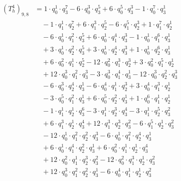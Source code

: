 \begin{align*}(T_{h}^4)_{9,8}&=1\cdot q_0^{1}\cdot q_3^{7}-6\cdot q_0^{3}\cdot q_3^{5}+6\cdot q_0^{5}\cdot q_3^{3}-1\cdot q_0^{7}\cdot q_3^{1}\\
&\quad -1\cdot q_1^{1}\cdot q_2^{7}+6\cdot q_1^{3}\cdot q_2^{5}-6\cdot q_1^{5}\cdot q_2^{3}+1\cdot q_1^{7}\cdot q_2^{1}\\
&\quad -6\cdot q_0^{1}\cdot q_1^{2}\cdot q_3^{5}+6\cdot q_0^{1}\cdot q_1^{4}\cdot q_3^{3}-1\cdot q_0^{1}\cdot q_1^{6}\cdot q_3^{1}\\
&\quad +3\cdot q_0^{1}\cdot q_2^{2}\cdot q_3^{5}+3\cdot q_0^{1}\cdot q_2^{4}\cdot q_3^{3}+1\cdot q_0^{1}\cdot q_2^{6}\cdot q_3^{1}\\
&\quad +6\cdot q_0^{2}\cdot q_1^{1}\cdot q_2^{5}-12\cdot q_0^{2}\cdot q_1^{3}\cdot q_2^{3}+3\cdot q_0^{2}\cdot q_1^{5}\cdot q_2^{1}\\
&\quad +12\cdot q_0^{3}\cdot q_1^{2}\cdot q_3^{3}-3\cdot q_0^{3}\cdot q_1^{4}\cdot q_3^{1}-12\cdot q_0^{3}\cdot q_2^{2}\cdot q_3^{3}\\
&\quad -6\cdot q_0^{3}\cdot q_2^{4}\cdot q_3^{1}-6\cdot q_0^{4}\cdot q_1^{1}\cdot q_2^{3}+3\cdot q_0^{4}\cdot q_1^{3}\cdot q_2^{1}\\
&\quad -3\cdot q_0^{5}\cdot q_1^{2}\cdot q_3^{1}+6\cdot q_0^{5}\cdot q_2^{2}\cdot q_3^{1}+1\cdot q_0^{6}\cdot q_1^{1}\cdot q_2^{1}\\
&\quad -1\cdot q_1^{1}\cdot q_2^{1}\cdot q_3^{6}-3\cdot q_1^{1}\cdot q_2^{3}\cdot q_3^{4}-3\cdot q_1^{1}\cdot q_2^{5}\cdot q_3^{2}\\
&\quad +6\cdot q_1^{3}\cdot q_2^{1}\cdot q_3^{4}+12\cdot q_1^{3}\cdot q_2^{3}\cdot q_3^{2}-6\cdot q_1^{5}\cdot q_2^{1}\cdot q_3^{2}\\
&\quad -12\cdot q_0^{1}\cdot q_1^{2}\cdot q_2^{2}\cdot q_3^{3}-6\cdot q_0^{1}\cdot q_1^{2}\cdot q_2^{4}\cdot q_3^{1}\\
&\quad +6\cdot q_0^{1}\cdot q_1^{4}\cdot q_2^{2}\cdot q_3^{1}+6\cdot q_0^{2}\cdot q_1^{1}\cdot q_2^{1}\cdot q_3^{4}\\
&\quad +12\cdot q_0^{2}\cdot q_1^{1}\cdot q_2^{3}\cdot q_3^{2}-12\cdot q_0^{2}\cdot q_1^{3}\cdot q_2^{1}\cdot q_3^{2}\\
&\quad +12\cdot q_0^{3}\cdot q_1^{2}\cdot q_2^{2}\cdot q_3^{1}-6\cdot q_0^{4}\cdot q_1^{1}\cdot q_2^{1}\cdot q_3^{2}\end{align*}
